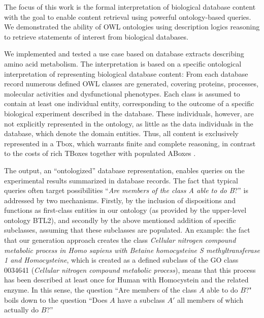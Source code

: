 The focus of this work is the formal interpretation of biological database content with the goal to enable content retrieval using powerful ontology-based queries.
We demonstrated the ability of OWL ontologies using description logics reasoning to retrieve statements of interest from biological databases. 

We implemented and tested a use case based on database extracts describing amino acid metabolism. 
The interpretation is based on a specific ontological interpretation of representing biological database content: From each database record numerous defined OWL classes are generated, covering proteins, processes, molecular activities and dysfunctional phenotypes. Each class is assumed to contain at least one individual entity, corresponding to the outcome of a specific biological experiment described in the database. These individuals, however, are not explicitly represented in the ontology, as little as the data individuals in the database, which denote the domain entities.    
Thus, all content is exclusively represented in a Tbox, which warrants finite and complete reasoning, in contrast to the costs of rich TBoxes together with populated ABoxes \citep{Motik2006a}. 




The output, an ``ontologized'' database representation, enables queries on the experimental results summarized in database records. 
The fact that typical queries often target possibilities ``\textit{Are members of the class A able to do B}?'' is addressed by two mechanisms. Firstly, by the inclusion of dispositions and functions as first-class entities in our ontology (as provided by the upper-level ontology BTL2), and secondly by the above mentioned addition of specific subclasses, assuming that these subclasses are  
populated. An example: the fact that our generation approach creates the class 
\textit{Cellular nitrogen compound metabolic process in Homo sapiens with Betaine homocysteine S methyltransferase 1 and Homocysteine}, which is created as a defined subclass of the GO class 0034641 (\textit{Cellular nitrogen compound metabolic process}), means that this process has been described at least once for Human with Homocystein and the related enzyme.  
In this sense, the question ``Are members of the class $A$ able to do $B$?" boils down to the question ``Does $A$ have a subclass $A'$ all members of which actually do $B$?''

